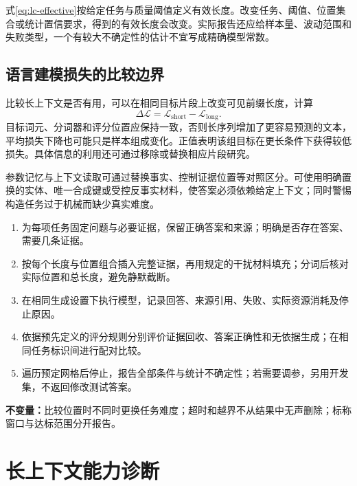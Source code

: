 \documentclass[../textbook.tex]{subfiles}
\begin{document}
式\eqref{eq:lc-effective}按给定任务与质量阈值定义有效长度。改变任务、阈值、位置集合或统计置信要求，得到的有效长度会改变。实际报告还应给样本量、波动范围和失败类型，一个有较大不确定性的估计不宜写成精确模型常数。

\subsection{语言建模损失的比较边界}
比较长上下文是否有用，可以在相同目标片段上改变可见前缀长度，计算
\begin{equation}
 \Delta\mathcal L=\mathcal L_{\mathrm{short}}-
 \mathcal L_{\mathrm{long}}.
\end{equation}
目标词元、分词器和评分位置应保持一致，否则长序列增加了更容易预测的文本，平均损失下降也可能只是样本组成变化。正值表明该组目标在更长条件下获得较低损失。具体信息的利用还可通过移除或替换相应片段研究。

参数记忆与上下文读取可通过替换事实、控制证据位置等对照区分。可使用明确置换的实体、唯一合成键或受控反事实材料，使答案必须依赖给定上下文；同时警惕构造任务过于机械而缺少真实难度。

\begin{algorithm}[长度与证据位置的受控评估]
\begin{enumerate}
\item 为每项任务固定问题与必要证据，保留正确答案和来源；明确是否存在答案、需要几条证据。
\item 按每个长度与位置组合插入完整证据，再用规定的干扰材料填充；分词后核对实际位置和总长度，避免静默截断。
\item 在相同生成设置下执行模型，记录回答、来源引用、失败、实际资源消耗及停止原因。
\item 依据预先定义的评分规则分别评价证据回收、答案正确性和无依据生成；在相同任务标识间进行配对比较。
\item 遍历预定网格后停止，报告全部条件与统计不确定性；若需要调参，另用开发集，不返回修改测试答案。
\end{enumerate}
\textbf{不变量：}比较位置时不同时更换任务难度；超时和越界不从结果中无声删除；标称窗口与达标范围分开报告。
\end{algorithm}

\section{长上下文能力诊断}
\end{document}

